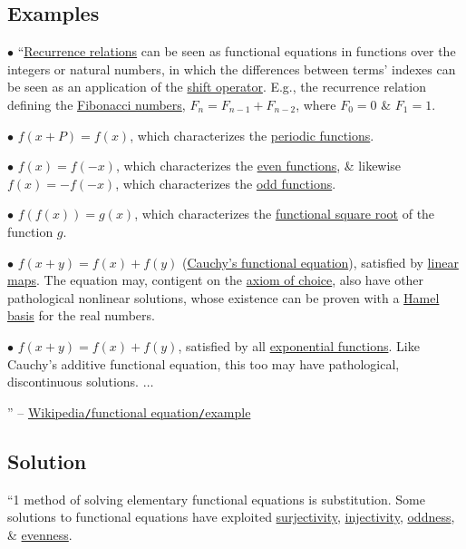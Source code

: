 \documentclass{article}
\numberwithin{equation}{section}
\begin{document}
\subsection{Examples}
\begin{enumerate*}
	\item[$\bullet$] ``\href{https://en.wikipedia.org/wiki/Recurrence_relation}{Recurrence relations} can be seen as functional equations in functions over the integers or natural numbers, in which the differences between terms' indexes can be seen as an application of the \href{https://en.wikipedia.org/wiki/Shift_operator}{shift operator}. E.g., the recurrence relation defining the \href{https://en.wikipedia.org/wiki/Fibonacci_numbers}{Fibonacci numbers}, $F_n = F_{n-1} + F_{n-2}$, where $F_0 = 0$ \& $F_1 = 1$.
	\item[$\bullet$] $f(x + P) = f(x)$, which characterizes the \href{https://en.wikipedia.org/wiki/Periodic_function}{periodic functions}.
	\item[$\bullet$] $f(x) = f(-x)$, which characterizes the \href{https://en.wikipedia.org/wiki/Even_function}{even functions}, \& likewise $f(x) = -f(-x)$, which characterizes the \href{https://en.wikipedia.org/wiki/Odd_function}{odd functions}.
	\item[$\bullet$] $f(f(x)) = g(x)$, which characterizes the \href{https://en.wikipedia.org/wiki/Functional_square_root}{functional square root} of the function $g$.
	\item[$\bullet$] $f(x + y) = f(x) + f(y)$ (\href{https://en.wikipedia.org/wiki/Cauchy%27s_functional_equation}{Cauchy's functional equation}), satisfied by \href{https://en.wikipedia.org/wiki/Linear_map}{linear maps}. The equation may, contigent on the \href{https://en.wikipedia.org/wiki/Axiom_of_choice}{axiom of choice}, also have other pathological nonlinear solutions, whose existence can be proven with a \href{https://en.wikipedia.org/wiki/Hamel_basis}{Hamel basis} for the real numbers.
	\item[$\bullet$] $f(x + y) = f(x) + f(y)$, satisfied by all \href{https://en.wikipedia.org/wiki/Exponential_function}{exponential functions}. Like Cauchy's additive functional equation, this too may have pathological, discontinuous solutions. $\ldots$
\end{enumerate*}
'' -- \href{https://en.wikipedia.org/wiki/Functional_equation#Examples}{Wikipedia\texttt{/}functional equation\texttt{/}example}

\subsection{Solution}
``1 method of solving elementary functional equations is substitution. Some solutions to functional equations have exploited \href{https://en.wikipedia.org/wiki/Surjective}{surjectivity}, \href{https://en.wikipedia.org/wiki/Injective_function}{injectivity}, \href{https://en.wikipedia.org/wiki/Odd_function}{oddness}, \& \href{https://en.wikipedia.org/wiki/Even_function}{evenness}.
\end{document}
